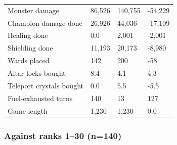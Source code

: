 \documentclass[
  10pt,
]{article}
\begin{document}
{\begin{longtable}[]{@{}llll@{}}
Monster damage & 86,526 & 140,755 & -54,229 \\
Champion damage done & 26,926 & 44,036 & -17,109 \\
Healing done & 0.0 & 2,001 & -2,001 \\
Shielding done & 11,193 & 20,173 & -8,980 \\
Wards placed & 142 & 200 & -58 \\
Altar locks bought & 8.4 & 4.1 & 4.3 \\
Teleport crystals bought & 0.0 & 5.5 & -5.5 \\
Fuel-exhausted turns & 140 & 13 & 127 \\
Game length & 1,230 & 1,230 & 0.0 \\
\end{longtable}
}

\subsubsection{Against ranks 1--30
(n=140)}\label{against-ranks-130-n140}
\end{document}
